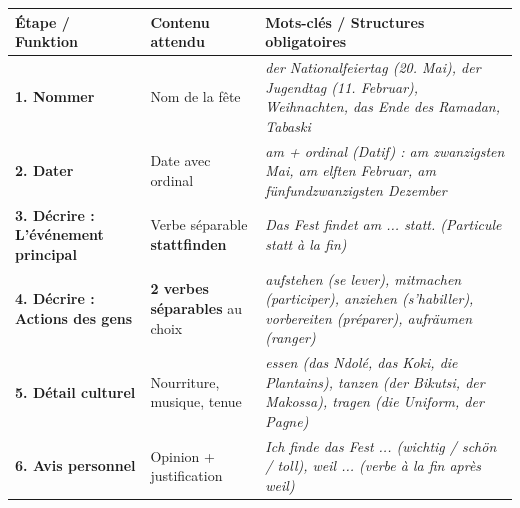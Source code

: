 \documentclass[11pt]{article}
\newcommand{\all}[1]{\ifmmode\text{\textit{#1}}\else\begingroup\selectlanguage{ngerman}\itshape #1\endgroup\fi}
\begin{document}
\begin{center}
\begin{tabularx}{\linewidth}{|X|X|X|}
\hline
\rowcolor{popblueL} \textbf{Étape / Funktion} & \textbf{Contenu attendu} & \textbf{Mots-clés / Structures obligatoires} \\ \hline
\textbf{1. Nommer} & Nom de la fête & \all{der Nationalfeiertag} (20. Mai), \all{der Jugendtag} (11. Februar), \all{Weihnachten}, \all{das Ende des Ramadan}, \all{Tabaski} \\ \hline
\textbf{2. Dater} & Date avec ordinal & \all{am} + ordinal (Datif) : \all{am zwanzigsten Mai}, \all{am elften Februar}, \all{am fünfundzwanzigsten Dezember} \\ \hline
\textbf{3. Décrire : L'événement principal} & Verbe séparable \textbf{stattfinden} & \all{Das Fest findet am ... statt.} (Particule \all{statt} à la fin) \\ \hline
\textbf{4. Décrire : Actions des gens} & \textbf{2 verbes séparables} au choix & \all{aufstehen} (se lever), \all{mitmachen} (participer), \all{anziehen} (s'habiller), \all{vorbereiten} (préparer), \all{aufräumen} (ranger) \\ \hline
\textbf{5. Détail culturel} & Nourriture, musique, tenue & \all{essen} (\all{das} Ndolé, \all{das} Koki, \all{die} Plantains), \all{tanzen} (\all{der} Bikutsi, \all{der} Makossa), \all{tragen} (\all{die} Uniform, \all{der} Pagne) \\ \hline
\textbf{6. Avis personnel} & Opinion + justification & \all{Ich finde das Fest ... (wichtig / schön / toll), weil ...} (verbe à la fin après \all{weil}) \\ \hline
\end{tabularx}
\end{center}
\end{document}
